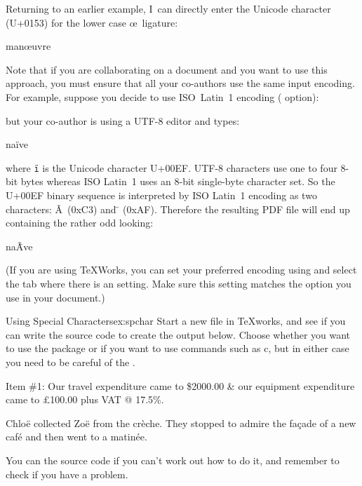 Returning to an earlier example, 
I~can directly enter the Unicode character (U+0153) for the
lower case \oe\ ligature:
\bookpagebreak
\begin{codeS}
man\oe uvre
\end{codeS}
Note that if you are collaborating on a document and you want to
use this approach, you must ensure that all your co-authors use the
same input encoding. For example, suppose you decide to use
ISO~Latin~1 encoding ( option):
\begin{codeS}
\end{codeS}
but your co-author is using a UTF-8 editor and types:
\begin{codeS}
na\"ive
\end{codeS}
where \texttt{\"i} is the Unicode character U+00EF\@. UTF-8 characters
use one to four 8-bit bytes whereas ISO Latin~1 uses an 8-bit
single-byte character set. So the U+00EF binary sequence is
interpreted by ISO Latin~1 encoding as two characters: \~A\ (0xC3)
and \={ } (0xAF)\@.  Therefore the resulting PDF file will end up
containing the rather odd looking:
\begin{flushleft}\wrong
na\~A\={ }ve
\end{flushleft}\html{\par}%
(If you are using TeXWorks, you can set your preferred encoding
using \menuto{} and select the  tab 
where there is an  setting. Make sure this setting
matches the  option you use in your document.)

\begin{exercise}{Using Special Characters}{ex:spchar}
Start a new file in TeXworks, and
see if you can write the source code to create the output below.
Choose 
whether you want to use the  package or if you
want to use commands such as \gls{c}, but in either case you need to
be careful of the .

\begin{result}[spcharex.html]\setlength{\parindent}{1.5em}%
Item \#1: Our travel expenditure came to \$2000.00 
\& our equipment expenditure came
to \pounds 100.00 plus VAT @ 17.5\%.

Chlo\"e collected Zo\"e from the cr\`eche. They stopped to
admire the fa\c{c}ade of a new caf\'e and then went to a matin\'ee.
\end{result}

You can  the source code if you can't work out
how to do it, and remember to check \appendixref{ch:errors} if you have a problem.

\end{exercise}

